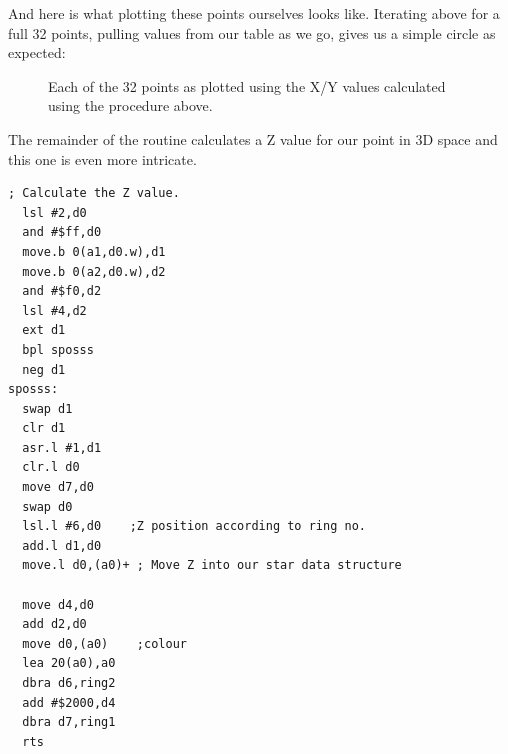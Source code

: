 And here is what plotting these points ourselves looks like. Iterating above for a full 32 points, pulling values
from our  table as we go, gives us a simple circle as expected:
\begin{figure}[H]
    \centering
    \begin{adjustbox}{width=8cm,center}
    \end{adjustbox}
  \caption{Each of the 32 points as plotted using the X/Y values calculated using the procedure above.}
\end{figure}

The remainder of the routine calculates a Z value for our point in 3D space and this one is even more
intricate.

\begin{lstlisting}[caption=Calculating the Z and color value for the starfield data structure used in the Tempest 2000 credits screen.]
  ; Calculate the Z value.
  lsl #2,d0
  and #$ff,d0
  move.b 0(a1,d0.w),d1
  move.b 0(a2,d0.w),d2
  and #$f0,d2
  lsl #4,d2
  ext d1
  bpl sposss
  neg d1
sposss:
  swap d1
  clr d1
  asr.l #1,d1
  clr.l d0
  move d7,d0
  swap d0
  lsl.l #6,d0    ;Z position according to ring no.
  add.l d1,d0
  move.l d0,(a0)+ ; Move Z into our star data structure

  move d4,d0
  add d2,d0
  move d0,(a0)    ;colour
  lea 20(a0),a0
  dbra d6,ring2
  add #$2000,d4
  dbra d7,ring1
  rts
\end{lstlisting}


